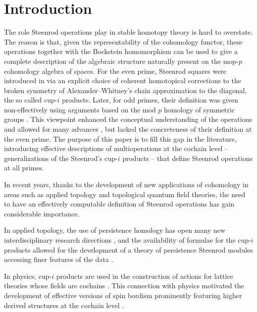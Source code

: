 
\section{Introduction} \label{s:introduction}

The role Steenrod operations play in stable homotopy theory is hard to overstate.
The reason is that, given the representability of the cohomology functor, these operations together with the Bockstein homomorphism can be used to give a complete description of the algebraic structure naturally present on the mop-$p$ cohomology algebra of spaces.
For the even prime, Steenrod squares were introduced in \cite{steenrod1947products} via an explicit choice of coherent homotopical corrections to the broken symmetry of Alexander--Whitney's chain approximation to the diagonal, the so called cup-$i$ products.
Later, for odd primes, their definition was given non-effectively using arguments based on the mod $p$ homology of symmetric groups \cite{steenrod1952reduced, steenrod1962cohomology, steenrod1962cohomology}.
This viewpoint enhanced the conceptual understanding of the operations and allowed for many advances \cite{adem1952iteration, milnor1958dual, adams1995stable}, but lacked the concreteness of their definition at the even prime.
The purpose of this paper is to fill this gap in the literature, introducing effective descriptions of multioperations at the cochain level -- generalizations of the Steenrod's cup-$i$ products -- that define Steenrod operations at all primes.

In recent years, thanks to the development of new applications of cohomology in areas such as applied topology and topological quantum field theories, the need to have an effectively computable definition of Steenrod operations has gain considerable importance.

In applied topology, the use of persistence homology \cite{edelsbrunner2002topological, carlsson2005barcode} has open many new interdisciplinary research directions \cite{chan2013viral, hess2017cliques}, and the availability of formulae for the cup-$i$ products allowed for the development of a theory of persistence Steenrod modules accessing finer features of the data \cite{medina2018persistence}.

In physics, cup-$i$ products are used in the construction of actions for lattice theories whose fields are cochains \cite{gaiotto2016spin, bhardwaj2017fermionic, kapustin2017fermionic}.
This connection with physics motivated the development of effective versions of spin bordism \cite{brumfiel2016pontrjagin, brumfiel2018pontrjagin} prominently featuring higher derived structures at the cochain level \cite{medina2020cartan, medina2021adem}.

